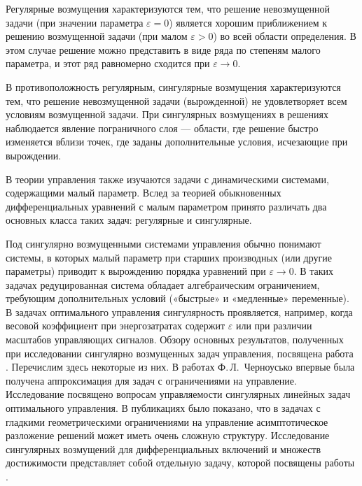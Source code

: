 \documentclass[../main.tex]{subfiles}
\begin{document}
Регулярные возмущения характеризуются тем, что решение невозмущенной задачи (при значении параметра $\varepsilon = 0$) является хорошим приближением к решению возмущенной задачи (при малом $\varepsilon > 0$) во всей области определения. 
В этом случае решение можно представить в виде ряда по степеням малого параметра, и этот ряд равномерно сходится при $\varepsilon \to 0$.

В противоположность регулярным, сингулярные возмущения характеризуются тем, что решение невозмущенной задачи (вырожденной) не удовлетворяет всем условиям возмущенной задачи. 
При сингулярных возмущениях в решениях наблюдается явление пограничного слоя --- области, где решение быстро изменяется вблизи точек, где заданы дополнительные условия, исчезающие при вырождении.

В теории управления также изучаются задачи с динамическими системами, содержащими малый параметр. 
Вслед за теорией обыкновенных дифференциальных уравнений с малым параметром принято различать два основных класса таких задач: регулярные и сингулярные. 

Под сингулярно возмущенными системами управления обычно понимают системы, в которых малый параметр при старших производных (или другие параметры) приводит к вырождению порядка уравнений при $\varepsilon\to0$. 
В таких задачах редуцированная система обладает алгебраическим ограничением, требующим дополнительных условий («быстрые» и «медленные» переменные). 
В задачах оптимального управления сингулярность проявляется, например, когда весовой коэффициент при энергозатратах содержит $\varepsilon$ или при различии масштабов управляющих сигналов. 
Обзору основных результатов, полученных при исследовании сингулярно возмущенных задач управления, посвящена работа \cite{Dmitriev}.
Перечислим здесь некоторые из них. 
В работах Ф.\,Л.~Черноусько \cite{Chernousko1968, Chernousko1977} впервые была получена аппроксимация для задач с ограничениями на управление.
Исследование \cite{Kokotovic} посвящено вопросам управляемости сингулярных линейных задач оптимального управления.
В публикациях \cite{Ilyin1989, Ilyin1998} было показано, что в задачах с гладкими геометрическими ограничениями на управление асимптотическое разложение решений может иметь очень сложную структуру. 
Исследование сингулярных возмущений для дифференциальных включений и множеств достижимости представляет собой отдельную задачу, которой посвящены работы \cite{FilippovaKurzhansky, Veliov, GONCHAROVAOVSEEVICH}.
\end{document}
